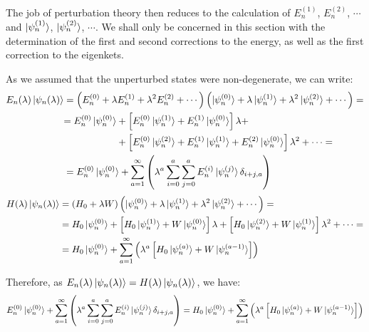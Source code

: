 The job of perturbation theory then reduces to the calculation of $E_n^{(1)}$, $E_n^{(2)}$, $\cdots$ and $\ket{\psi_n^{(1)}}$, $\ket{\psi_n^{(2)}}$, $\cdots$. We shall only be concerned in this section with the determination of the first and second corrections to the energy, as well as the first correction to the eigenkets.

As we assumed that the unperturbed states were non-degenerate, we can write:
\begin{equation}
    \begin{split}
        E_n(\lambda)\ket{\psi_n(\lambda)} &= \left(E_n^{(0)} + \lambda E_n^{(1)} + \lambda^2 E_n^{(2)} + \cdots\right)\left(\ket{\psi_n^{(0)}} + \lambda \ket{\psi_n^{(1)}} + \lambda^2\ket{\psi_n^{(2)}} + \cdots\right) = \\
        &\begin{split}
            = E_n^{(0)}\ket{\psi_n^{(0)}} &+ \left[E_n^{(0)}\ket{\psi_n^{(1)}} + E_n^{(1)}\ket{\psi_n^{(0)}}\right] \lambda + \\ 
            &+ \left[E_n^{(0)}\ket{\psi_n^{(2)}} + E_n^{(1)}\ket{\psi_n^{(1)}} + E_n^{(2)}\ket{\psi_n^{(0)}}\right] \lambda^2 + \cdots =
        \end{split} \\
        &= E_n^{(0)}\ket{\psi_n^{(0)}} + \sum_{a=1}^\infty \left(\lambda^a\sum_{i=0}^a\sum_{j=0}^{a}E_n^{(i)}\ket{\psi_n^{(j)}}\delta_{i+j,a}\right)
    \end{split}
\end{equation}
\begin{equation}
    \begin{split}
        H(\lambda)\ket{\psi_n(\lambda)} &= \left(H_0+\lambda W\right)\left(\ket{\psi_n^{(0)}} + \lambda \ket{\psi_n^{(1)}} + \lambda^2\ket{\psi_n^{(2)}} + \cdots\right) = \\
        &= H_0\ket{\psi_n^{(0)}} + \left[H_0\ket{\psi_n^{(1)}} + W\ket{\psi_n^{(0)}}\right] \lambda + \left[H_0\ket{\psi_n^{(2)}} + W\ket{\psi_n^{(1)}}\right] \lambda^2 + \cdots =\\
        &= H_0\ket{\psi_n^{(0)}} + \sum_{a=1}^\infty \left(\lambda^a \left[H_0\ket{\psi_n^{(a)}} + W \ket{\psi_n^{(a-1)}}\right]\right)
    \end{split}
\end{equation}

Therefore, as $E_n(\lambda)\ket{\psi_n(\lambda)} = H(\lambda)\ket{\psi_n(\lambda)}$, we have:
\begin{equation}
    E_n^{(0)}\ket{\psi_n^{(0)}} + \sum_{a=1}^\infty \left(\lambda^a\sum_{i=0}^{a}\sum_{j=0}^{a}E_n^{(i)}\ket{\psi_n^{(j)}}\delta_{i+j,a}\right) = H_0\ket{\psi_n^{(0)}} + \sum_{a=1}^\infty \left(\lambda^a \left[H_0\ket{\psi_n^{(a)}} + W \ket{\psi_n^{(a-1)}}\right]\right)
\end{equation}

